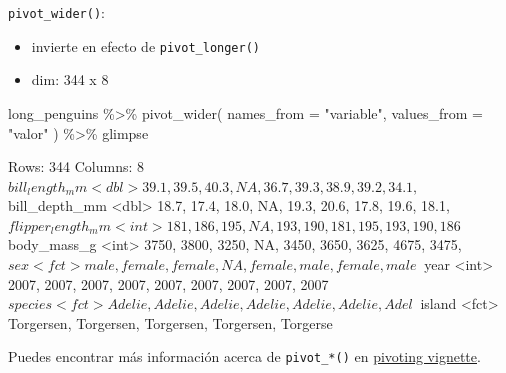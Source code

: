 \documentclass[
  ignorenonframetext,
  aspectratio=169]{beamer}
\newenvironment{Shaded}{\begin{snugshade}}{\end{snugshade}}
\newcommand{\AttributeTok}[1]{\textcolor[rgb]{0.77,0.63,0.00}{#1}}
\newcommand{\FunctionTok}[1]{\textcolor[rgb]{0.00,0.00,0.00}{#1}}
\newcommand{\NormalTok}[1]{#1}
\newcommand{\SpecialCharTok}[1]{\textcolor[rgb]{0.00,0.00,0.00}{#1}}
\newcommand{\StringTok}[1]{\textcolor[rgb]{0.31,0.60,0.02}{#1}}
\let\oldverbatim\verbatim
\let\endoldverbatim\endverbatim
\renewenvironment{verbatim}{\tiny\oldverbatim}{\endoldverbatim}
\begin{document}
\begin{frame}[fragile]
\texttt{pivot\_wider()}:

\begin{itemize}
\item
  invierte en efecto de \texttt{pivot\_longer()}
\item
  dim: 344 x 8
\end{itemize}

\begin{Shaded}
\begin{Highlighting}[]
\NormalTok{long\_penguins }\SpecialCharTok{\%\textgreater{}\%} 
  \FunctionTok{pivot\_wider}\NormalTok{(}
    \AttributeTok{names\_from =} \StringTok{"variable"}\NormalTok{, }\AttributeTok{values\_from =} \StringTok{"valor"}
\NormalTok{  ) }\SpecialCharTok{\%\textgreater{}\%}
\NormalTok{glimpse}
\end{Highlighting}
\end{Shaded}

\begin{verbatim}
Rows: 344
Columns: 8
$ bill_length_mm    <dbl> 39.1, 39.5, 40.3, NA, 36.7, 39.3, 38.9, 39.2, 34.1, ~
$ bill_depth_mm     <dbl> 18.7, 17.4, 18.0, NA, 19.3, 20.6, 17.8, 19.6, 18.1, ~
$ flipper_length_mm <int> 181, 186, 195, NA, 193, 190, 181, 195, 193, 190, 186~
$ body_mass_g       <int> 3750, 3800, 3250, NA, 3450, 3650, 3625, 4675, 3475, ~
$ sex               <fct> male, female, female, NA, female, male, female, male~
$ year              <int> 2007, 2007, 2007, 2007, 2007, 2007, 2007, 2007, 2007~
$ species           <fct> Adelie, Adelie, Adelie, Adelie, Adelie, Adelie, Adel~
$ island            <fct> Torgersen, Torgersen, Torgersen, Torgersen, Torgerse~
\end{verbatim}

Puedes encontrar más información acerca de \texttt{pivot\_*()} en
\href{https://tidyr.tidyverse.org/articles/pivot.html}{pivoting
vignette}.
\end{frame}
\end{document}
